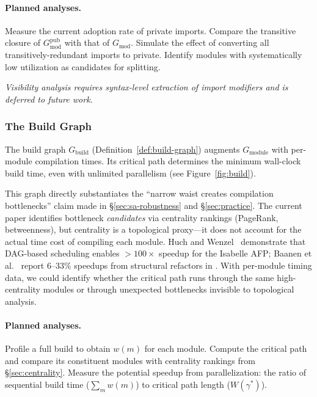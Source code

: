 \paragraph{Planned analyses.}
Measure the current adoption rate of private imports. Compare the transitive closure of $G_{\mathrm{mod}}^{\mathrm{pub}}$ with that of $G_{\mathrm{mod}}$. Simulate the effect of converting all transitively-redundant imports to private. Identify modules with systematically low utilization as candidates for splitting.

\emph{Visibility analysis requires syntax-level extraction of import modifiers and is deferred to future work.}

\subsubsection{The Build Graph}
\label{sec:build-graph}

The build graph $G_{\mathrm{build}}$ (Definition~\ref{def:build-graph}) augments $G_{\mathrm{module}}$ with per-module compilation times. Its critical path determines the minimum wall-clock build time, even with unlimited parallelism (see Figure~\ref{fig:build}).

This graph directly substantiates the ``narrow waist creates compilation bottlenecks'' claim made in \S\ref{sec:sa-robustness} and \S\ref{sec:practice}. The current paper identifies bottleneck \emph{candidates} via centrality rankings (PageRank, betweenness), but centrality is a topological proxy---it does not account for the actual time cost of compiling each module. Huch and Wenzel~\cite{huch2024} demonstrate that DAG-based scheduling enables $>100\times$ speedup for the Isabelle AFP; Baanen et al.~\cite{baanen2025} report $6$--$33\%$ speedups from structural refactors in . With per-module timing data, we could identify whether the critical path runs through the same high-centrality modules or through unexpected bottlenecks invisible to topological analysis.

\paragraph{Planned analyses.}
Profile a full  build to obtain $w(m)$ for each module. Compute the critical path and compare its constituent modules with centrality rankings from \S\ref{sec:centrality}. Measure the potential speedup from parallelization: the ratio of sequential build time ($\sum_m w(m)$) to critical path length ($W(\gamma^*)$).


